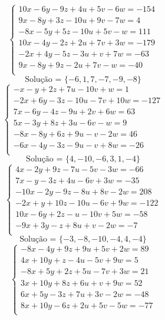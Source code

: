 \documentclass[12pt,oneside,a4paper]{article}
\begin{document}
\vspace{\baselineskip}
\begin{equation*}
\begin{cases}
10x-6y-9z+4u+5v-6w=-154 \\
9x-8y+3z-10u+9v-7w=4 \\
-8x-5y+5z-10u+5v-w=111 \\
10x-4y-2z+2u+7v+3w=-179 \\
-2x+4y-5z-3u+v+7w=-63 \\
9x-8y+9z-2u+7v-w=-40 \\
\end{cases}
\end{equation*}
\begin{equation*}
\text{Solução = }\{-6,1,7,-7,-9,-8\}
\end{equation*}
\vspace{\baselineskip}
\begin{equation*}
\begin{cases}
-x-y+2z+7u-10v+w=1 \\
-2x+6y-3z-10u-7v+10w=-127 \\
7x-6y-4z-9u+2v+6w=63 \\
5x-3y+8z+3u-6v-w=9 \\
-8x-8y+6z+9u-v-2w=46 \\
-6x-4y-3z-9u-v+8w=-26 \\
\end{cases}
\end{equation*}
\begin{equation*}
\text{Solução = }\{4,-10,-6,3,1,-4\}
\end{equation*}
\vspace{\baselineskip}
\begin{equation*}
\begin{cases}
4x-2y+9z-7u-5v-3w=-66 \\
7x-y-3z+4u-6v+3w=-35 \\
-10x-2y-9z-8u+8v-2w=208 \\
-2x+y+10z-10u-6v+9w=-122 \\
10x-6y+2z-u-10v+5w=-58 \\
-9x+3y-z+8u+v-2w=-7 \\
\end{cases}
\end{equation*}
\begin{equation*}
\text{Solução = }\{-3,-8,-10,-4,4,-4\}
\end{equation*}
\vspace{\baselineskip}
\begin{equation*}
\begin{cases}
-8x-4y+9z+9u+5v+2w=89 \\
4x+10y+z-4u-5v+9w=5 \\
-8x+5y+2z+5u-7v+3w=21 \\
3x+10y+8z+6u+v+9w=52 \\
6x+5y-3z+7u+3v-2w=-48 \\
8x+10y-6z+2u+5v-5w=-77 \\
\end{cases}
\end{equation*}
\end{document}
